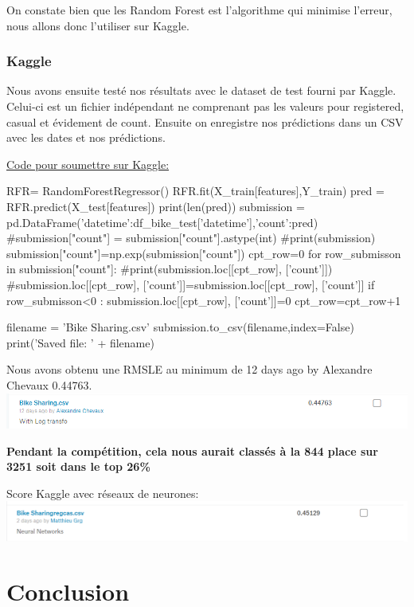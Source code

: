 \documentclass[a4paper,oneside,11pt]{article}
\begin{document}
\qquad On constate bien que les Random Forest est l'algorithme qui minimise l'erreur, nous allons donc l'utiliser sur Kaggle.

\section*{Kaggle}
%

\qquad Nous avons ensuite testé nos résultats avec le dataset de test fourni par Kaggle. Celui-ci est un fichier indépendant ne comprenant pas les valeurs pour registered, casual et évidement de count.
Ensuite on enregistre nos prédictions dans un CSV avec les dates et nos prédictions.

\underline{Code pour soumettre sur Kaggle:}
\begin{code-Python}
RFR= RandomForestRegressor()
RFR.fit(X_train[features],Y_train)
pred = RFR.predict(X_test[features])
print(len(pred))
submission = pd.DataFrame({'datetime':df_bike_test['datetime'],'count':pred})
#submission["count"] = submission["count"].astype(int)
#print(submission)
submission["count"]=np.exp(submission["count"])
cpt_row=0
for row_submisson in submission["count"]:
        #print(submission.loc[[cpt_row], ['count']])
    #submission.loc[[cpt_row], ['count']]=submission.loc[[cpt_row], ['count']]
    if row_submisson<0 :
            submission.loc[[cpt_row], ['count']]=0
    cpt_row=cpt_row+1
 
filename = 'Bike Sharing.csv'
submission.to_csv(filename,index=False)
print('Saved file: ' + filename)
\end{code-Python}

Nous avons obtenu une RMSLE au minimum de 
12 days ago by Alexandre Chevaux 0.44763.
\includegraphics[width=1\textwidth]{image_rapport/Kaggle}

\textbf{Pendant la compétition, cela nous aurait classés à la 844 place sur 3251 soit dans le top 26\%}

Score Kaggle avec réseaux de neurones: \newline
\includegraphics[width=1\textwidth]{image_rapport/scoreNN}
\newpage
\part*{Conclusion}
%
\end{document}
